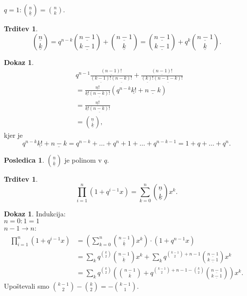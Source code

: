 \documentclass[a4paper, 12pt]{book}
\theoremstyle{definition}
\newtheorem{conseq}[counter]{Posledica}
\newtheorem{claim}[counter]{Trditev}
\newtheorem{pro}[counter]{Dokaz}
\theoremstyle{remark}
\begin{document}
$q = 1: \binom{\underline{n}}{\underline{k}} = \binom{n}{k}$.
\begin{claim}
  \begin{equation*}
    \binom{\underline{n}}{\underline{k}}
    = q^{n-k} \binom{\underline{n-1}}{\underline{k-1}} + \binom{\underline{n-1}}{\underline{k}}
    = \binom{\underline{n-1}}{\underline{k-1}} + q^k \binom{\underline{n-1}}{\underline{k}}.
  \end{equation*}
\end{claim}
\begin{pro}
  \begin{align*}
    &q^{n-1} \frac{\underline{(n-1)!}}{\underline{(k-1)!} \underline{(n-k)!}} + \frac{\underline{(n-1)!}}{\underline{(k)!} \underline{(n-1-k)!}} \\
    &= \frac{\underline{n!}}{\underline{k!} \underline{(n-k)!}} (q^{n-k} \underline{k!} + \underline{n-k}) \\
    &= \frac{\underline{n!}}{\underline{k!} \underline{(n-k)!}} \\
    &= \binom{\underline{n}}{\underline{k}},
  \end{align*}
  kjer je
  \begin{equation*}
    q^{n-k} \underline{k!} + \underline{n-k} = q^{n-k} + \dots + q^n + 1 + \dots + q^{n-k-1} = 1 + q + \dots + q^n.
  \end{equation*}
\end{pro}
\begin{conseq}
  $\binom{\underline{n}}{\underline{k}}$ je polinom v $q$.
\end{conseq}
\begin{claim}
  \begin{equation*}
    \prod_{i=1}^{n} (1 + q^{i-1}x) = \sum_{k=0}^{n} \binom{\underline{n}}{\underline{k}} x^k.
  \end{equation*}
\end{claim}
\begin{pro}
  Indukcija: \\
  $n = 0: 1 = 1$ \\
  $n - 1 \to n$:
  \begin{align*}
    \prod_{i=1}^{n} (1 + q^{i-1}x) &= \left(\sum_{k=0}^{n} \binom{\underline{n-1}}{\underline{k}} x^k\right) \cdot (1 + q^{n-1}x) \\
    &= \sum_k q^{\binom{k}{2}} \binom{\underbar{n-1}}{\underline{k}} x^k
      + \sum_k q^{\binom{k-1}{2}+n-1} \binom{\underline{n-1}}{\underline{k-1}} x^k \\
    &= \sum_k q^{\binom{k}{2}} \left(\binom{\underline{n-1}}{k} +
      q^{\binom{k-1}{2}+n-1-\binom{k}{2}} \binom{\underline{n-1}}{\underline{k-1}}\right) x^k.
  \end{align*}
  Upoštevali smo $\binom{k-1}{2} - \binom{k}{2} = - \binom{k-1}{1}$.
\end{pro}
\end{document}
